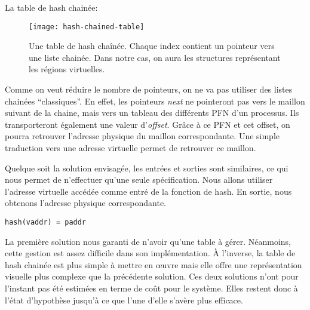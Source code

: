       \begin{paragraph}{La table de hash chainée:}

        \begin{figure}[ht]
          \centering
          \texttt{[image: hash-chained-table]}
          \caption{Une table de hash chaînée. Chaque index contient un pointeur
            vers une liste chainée. Dans notre cas, on aura les structures
            représentant les régions virtuelles.}
          \label{fig:hash-chained-table}
        \end{figure}

        Comme on veut réduire le nombre de pointeurs, on ne va pas utiliser des
        listes chainées ``classiques''. En effet, les pointeurs \textit{next} ne
        pointeront pas vers le maillon suivant de la chaine, mais vers un
        tableau des différents PFN d'un processus. Ils transporteront également
        une valeur d'\textit{offset}. Grâce à ce PFN et cet offset, on pourra
        retrouver l'adresse physique du maillon correspondante. Une simple
        traduction vers une adresse virtuelle permet de retrouver ce maillon.

        Quelque soit la solution envisagée, les entrées et sorties sont
        similaires, ce qui nous permet de n'effectuer qu'une seule
        spécification. Nous allons utiliser l'adresse virtuelle accédée comme
        entré de la fonction de hash. En sortie, nous obtenons l'adresse
        physique correspondante.

        \begin{center}
          \texttt{hash(vaddr) = paddr}
        \end{center}

      \end{paragraph}

      La première solution nous garanti de n'avoir qu'une table à
      gérer. Néanmoins, cette gestion est assez difficile dans son
      implémentation. À l'inverse, la table de hash chainée est plus simple à
      mettre en \oe uvre mais elle offre une représentation visuelle plus
      complexe que la précédente solution. Ces deux solutions n'ont pour
      l'instant pas été estimées en terme de coût pour le système. Elles restent
      donc à l'état d'hypothèse jusqu'à ce que l'une d'elle s'avère plus
      efficace.


